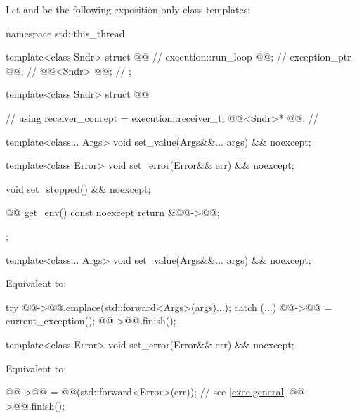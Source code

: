 \pnum
Let  and 
be the following exposition-only class templates:
\begin{codeblock}
namespace std::this_thread {
  template<class Sndr>
  struct @@ {                                      // \expos
    execution::run_loop @@;                                   // \expos
    exception_ptr @@;                                        // \expos
    @@<Sndr> @@;                         // \expos
  };

  template<class Sndr>
  struct @@ {                                   // \expos
    using receiver_concept = execution::receiver_t;
    @@<Sndr>* @@;                               // \expos

    template<class... Args>
    void set_value(Args&&... args) && noexcept;

    template<class Error>
    void set_error(Error&& err) && noexcept;

    void set_stopped() && noexcept;

    @@ get_env() const noexcept { return {&@@->@@}; }
  };
}
\end{codeblock}

\begin{itemdecl}
template<class... Args>
void set_value(Args&&... args) && noexcept;
\end{itemdecl}

\begin{itemdescr}
\pnum
\effects
Equivalent to:
\begin{codeblock}
try {
  @@->@@.emplace(std::forward<Args>(args)...);
} catch (...) {
  @@->@@ = current_exception();
}
@@->@@.finish();
\end{codeblock}
\end{itemdescr}

\begin{itemdecl}
template<class Error>
void set_error(Error&& err) && noexcept;
\end{itemdecl}

\begin{itemdescr}
\pnum
\effects
Equivalent to:
\begin{codeblock}
@@->@@ = @@(std::forward<Error>(err));    // see \ref{exec.general}
@@->@@.finish();
\end{codeblock}
\end{itemdescr}

